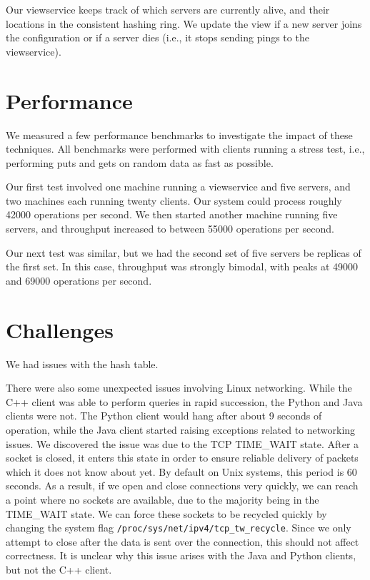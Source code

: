 \documentclass[letterpaper,11pt]{article}
\begin{document}
     Our viewservice keeps track of which servers are currently alive, and their locations in the consistent hashing ring.
     We update the view if a new server joins the configuration or if a server dies (i.e., it stops sending pings to the viewservice).

     \section{Performance}
     We measured a few performance benchmarks to investigate the impact of these techniques.
     All benchmarks were performed with clients running a stress test, i.e., performing puts and gets on random data as fast as possible.

     Our first test involved one machine running a viewservice and five servers, and two machines each running twenty clients.
     Our system could process roughly 42000 operations per second.
     We then started another machine running five servers, and throughput increased to between 55000 operations per second.

     Our next test was similar, but we had the second set of five servers be replicas of the first set.
     In this case, throughput was strongly bimodal, with peaks at 49000 and 69000 operations per second.

     \section{Challenges}
     We had issues with the hash table.

     There were also some unexpected issues involving Linux networking.
     While the C++ client was able to perform queries in rapid succession, the Python and Java clients were not.
     The Python client would hang after about 9 seconds of operation, while the Java client started raising exceptions related to networking issues.
     We discovered the issue was due to the TCP TIME\_WAIT state.
     After a socket is closed, it enters this state in order to ensure reliable delivery of packets which it does not know about yet.
     By default on Unix systems, this period is 60 seconds.
     As a result, if we open and close connections very quickly, we can reach a point where no sockets are available, due to the majority being in the TIME\_WAIT state.
     We can force these sockets to be recycled quickly by changing the system flag \verb=/proc/sys/net/ipv4/tcp_tw_recycle=.
     Since we only attempt to close after the data is sent over the connection, this should not affect correctness.
     It is unclear why this issue arises with the Java and Python clients, but not the C++ client.




\end{document}
